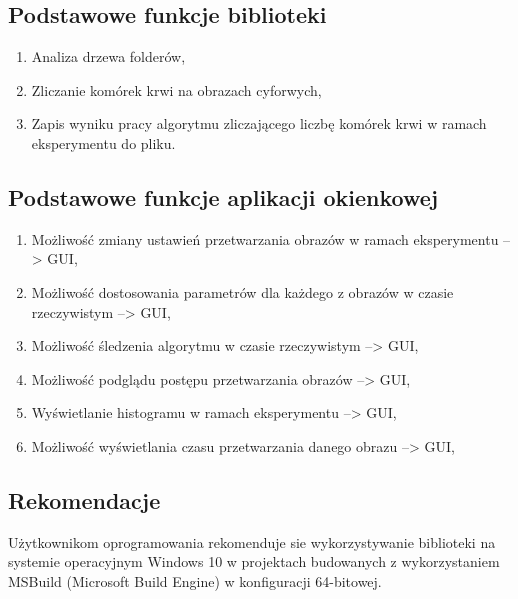 \documentclass{article}
\begin{document}
        \newpage
        \subsection{Podstawowe funkcje biblioteki}
        {
            \Large
            \quad
            \begin{enumerate}
                \item Analiza drzewa folderów,
                \item Zliczanie komórek krwi na obrazach cyforwych,
                \item Zapis wyniku pracy algorytmu zliczającego liczbę komórek krwi w ramach eksperymentu do pliku.
            \end{enumerate}
        }

        \subsection{Podstawowe funkcje aplikacji okienkowej}
        {
            \Large
            \quad
            \begin{enumerate}
                \item Możliwość zmiany ustawień przetwarzania obrazów w ramach eksperymentu --> GUI,
                \item Możliwość dostosowania parametrów dla każdego z obrazów w czasie rzeczywistym --> GUI,
                \item Możliwość śledzenia algorytmu w czasie rzeczywistym --> GUI,
                \item Możliwość podglądu postępu przetwarzania obrazów --> GUI,
                \item Wyświetlanie histogramu w ramach eksperymentu --> GUI,
                \item Możliwość wyświetlania czasu przetwarzania danego obrazu --> GUI,
            \end{enumerate}
        }

        \subsection{Rekomendacje}
        {
            \Large
            \justifying
            \quad
            Użytkownikom oprogramowania rekomenduje sie wykorzystywanie biblioteki na systemie operacyjnym Windows 10 w projektach budowanych z wykorzystaniem MSBuild (Microsoft Build Engine) w konfiguracji 64-bitowej. \cite{msdocsmsbuild}
        }
\end{document}

